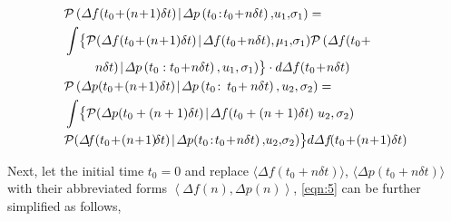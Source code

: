 \documentclass[lettersize,journal]{IEEEtran}
\newenvironment{newsubequations}{\small\begin{subequations}}{\end{subequations}}
\begin{document}
\begin{newsubequations}\label{eqn:5}
	\begin{align}
		 & \mathcal{P}\left(\varDelta f(t_0\!+\!(n\!+\!1)\delta t) \!\mid\! \varDelta p\left(t_{0}\!:\! t_0\!+\!n\delta t\right), \!u_{1},\! \sigma_{1}\right)=                                                                     \\
		 & \int \bigl\{\mathcal{P}(\varDelta f(t_0\!+\!(n\!+\!1)\delta t) \!\mid\! \varDelta f(t_0\!+\!n\delta t), \left.\!\mu_{1}, \!\sigma_{1}\right)\!\mathcal{P}\left(\varDelta f(t_0 +\!\right. \notag                         \\
		 & \qquad\,\, \left. \!n\delta t) \!\mid\!  \varDelta p\left(t_{0}: t_0\!+\!n\delta t\right), u_{1}, \sigma_{1}\right)\bigr\} \cdot d \varDelta f(t_0 \!+\! n\delta t)\notag                                                \\
		 & \mathcal{P}\left(\varDelta p(t_0\!+\!(n\!+\!1)\delta t) \!\mid\!  \varDelta p\left(t_{0}\!:\! \right.\right. \left. \left.  t_0\!+n\delta t\right), u_{2}, \sigma_{2}\right) =                                           \\
		 & \int \bigl\{\mathcal{P}(\varDelta p(t_0+(n+1)\delta t) \!\mid\!  \varDelta f(t_0+(n+1)\delta t)\left.u_{2}, \sigma_{2}\right) \notag                                                                                     \\
		 & \mathcal{P}\!\left(\varDelta \!f(t_0\!+\!(n\!+\!1)\!\delta t) \!\mid\!  \varDelta p\!\left(t_{0}\!: \! t_0\!+\!n \delta t\right), \!u_{2}, \!\sigma_{2}\right) \bigr\} d \varDelta f\!(t_0\!+\!(n\!+\!1)\delta t) \notag
	\end{align}
\end{newsubequations}

Next, let the initial time $t_{0} = 0$ and replace $\langle \varDelta f(t_0 \!+\! n \delta t)\rangle$, $\langle \varDelta p(t_0 \!+\! n\delta t) \rangle$ with their abbreviated forms $\left\langle \varDelta f(n),\varDelta p(n)\right\rangle$, \cref{eqn:5} can be further simplified as follows,
\end{document}
